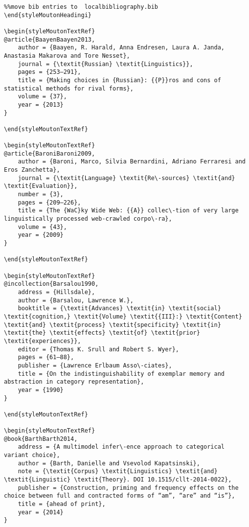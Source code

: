\begin{styleMoutonHeadingi}
\begin{verbatim}%%move bib entries to  localbibliography.bib
\end{styleMoutonHeadingi}

\begin{styleMoutonTextRef}
@article{BaayenBaayen2013,
	author = {Baayen, R. Harald, Anna Endresen, Laura A. Janda, Anastasia Makarova and Tore Nesset},
	journal = {\textit{Russian} \textit{Linguistics}},
	pages = {253–291},
	title = {Making choices in {Russian}: {{P}}ros and cons of statistical methods for rival forms},
	volume = {37},
	year = {2013}
}

\end{styleMoutonTextRef}

\begin{styleMoutonTextRef}
@article{BaroniBaroni2009,
	author = {Baroni, Marco, Silvia Bernardini, Adriano Ferraresi and Eros Zanchetta},
	journal = {\textit{Language} \textit{Re\-sources} \textit{and} \textit{Evaluation}},
	number = {3},
	pages = {209–226},
	title = {The {WaC}ky Wide Web: {{A}} collec\-tion of very large linguistically processed web-crawled corpo\-ra},
	volume = {43},
	year = {2009}
}

\end{styleMoutonTextRef}

\begin{styleMoutonTextRef}
@incollection{Barsalou1990,
	address = {Hillsdale},
	author = {Barsalou, Lawrence W.},
	booktitle = {\textit{Advances} \textit{in} \textit{social} \textit{cognition,} \textit{Volume} \textit{{III}:} \textit{Content} \textit{and} \textit{process} \textit{specificity} \textit{in} \textit{the} \textit{effects} \textit{of} \textit{prior} \textit{experiences}},
	editor = {Thomas K. Srull and Robert S. Wyer},
	pages = {61–88},
	publisher = {Lawrence Erlbaum Asso\-ciates},
	title = {On the indistinguishability of exemplar memory and abstraction in category representation},
	year = {1990}
}

\end{styleMoutonTextRef}

\begin{styleMoutonTextRef}
@book{BarthBarth2014,
	address = {A multimodel infer\-ence approach to categorical variant choice},
	author = {Barth, Danielle and Vsevolod Kapatsinski},
	note = {\textit{Corpus} \textit{Linguistics} \textit{and} \textit{Linguistic} \textit{Theory}. DOI 10.1515/cllt-2014-0022},
	publisher = {Construction, priming and frequency effects on the choice between full and contracted forms of “am”, “are” and “is”},
	title = {ahead of print},
	year = {2014}
}


\end{verbatim}
\end{styleMoutonHeadingi}
